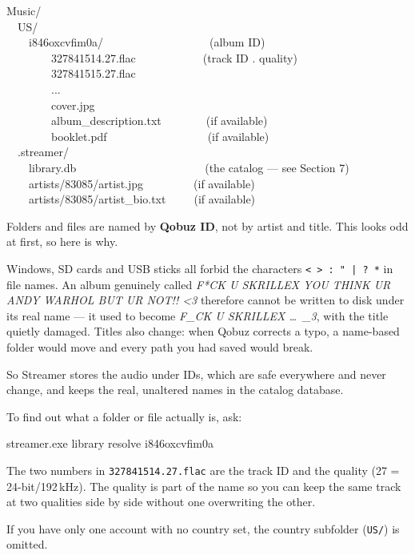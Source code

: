 \documentclass[11pt,a4paper]{article}
\begin{document}
\begin{cmdbox}
Music/\\
~~US/\\
~~~~i846oxcvfim0a/~~~~~~~~~~~~~~~~~~~(album ID)\\
~~~~~~~~327841514.27.flac~~~~~~~~~~~~(track ID . quality)\\
~~~~~~~~327841515.27.flac\\
~~~~~~~~...\\
~~~~~~~~cover.jpg\\
~~~~~~~~album\_description.txt~~~~~~~~(if available)\\
~~~~~~~~booklet.pdf~~~~~~~~~~~~~~~~~~(if available)\\
~~.streamer/\\
~~~~library.db~~~~~~~~~~~~~~~~~~~~~~~(the catalog --- see Section 7)\\
~~~~artists/83085/artist.jpg~~~~~~~~~(if available)\\
~~~~artists/83085/artist\_bio.txt~~~~~(if available)
\end{cmdbox}

Folders and files are named by \textbf{Qobuz ID}, not by artist and title.
This looks odd at first, so here is why.

Windows, SD cards and USB sticks all forbid the characters
\texttt{< > : " | ? *} in file names.  An album genuinely called
\emph{F*CK U SKRILLEX YOU THINK UR ANDY WARHOL BUT UR NOT!! <3} therefore
cannot be written to disk under its real name --- it used to become
\emph{F\_CK U SKRILLEX \ldots\ \_3}, with the title quietly damaged.  Titles
also change: when Qobuz corrects a typo, a name-based folder would move and
every path you had saved would break.

So Streamer stores the audio under IDs, which are safe everywhere and never
change, and keeps the real, unaltered names in the catalog database.

\begin{tipbox}
To find out what a folder or file actually is, ask:

\medskip
{\ttfamily streamer.exe library resolve i846oxcvfim0a}
\end{tipbox}

The two numbers in \texttt{327841514.27.flac} are the track ID and the quality
(27 = 24-bit/192\,kHz).  The quality is part of the name so you can keep the
same track at two qualities side by side without one overwriting the other.

If you have only one account with no country set, the country subfolder
(\texttt{US/}) is omitted.
\end{document}
